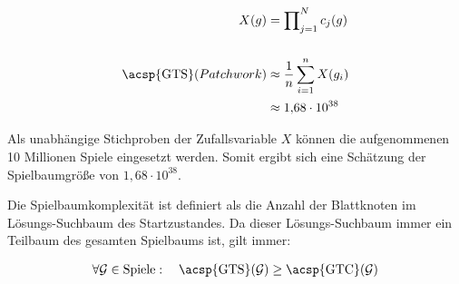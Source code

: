 \begin{equation}
    \label{eqn:gts-patchwork-avg-estimation}
    \begin{aligned}
        X(g)                         & = \prod\nolimits_{j=1}^{N} c_j(g)         \\[15pt]
        \text{\acsp{GTS}}(Patchwork) & \approx \frac{1}{n} \sum_{i=1}^{n} X(g_i) \\[1pt]
                                     & \approx 1{,}68 \cdot 10^{38}
    \end{aligned}
\end{equation}

Als unabhängige Stichproben der Zufallsvariable $X$ können die aufgenommenen 10 Millionen Spiele eingesetzt werden. Somit ergibt sich eine Schätzung der Spielbaumgröße von $1{,}68 \cdot 10^{38}$.

Die Spielbaumkomplexität ist definiert als die Anzahl der Blattknoten im Lösungs-Suchbaum des Startzustandes. Da dieser Lösungs-Suchbaum immer ein Teilbaum des gesamten Spielbaums ist, gilt immer:

\begin{equation}
    \label{eqn:gts-greater-equal-gtc}
    \begin{aligned}
        \forall \mathcal{G} \in \text{Spiele}:\quad \text{\acsp{GTS}}(\mathcal{G}) \geq \text{\acsp{GTC}}(\mathcal{G})
    \end{aligned}
\end{equation}

